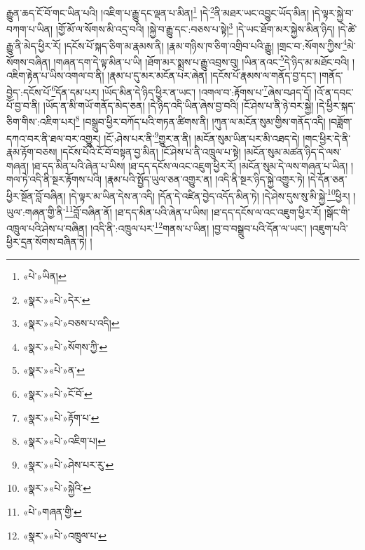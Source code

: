 རྒྱུན་ཆད་ངོ་བོ་གང་ཡིན་པའི། །འཇིག་པ་རྒྱུ་དང་ལྡན་པ་མིན།\footnote{«པེ་»ཡིན།} །དེ་\footnote{«སྣར་»«པེ་»དེར་}ནི་མཐར་ཡང་འབྱུང་ཡོད་མིན། །དེ་ལྟར་སྐྱེ་བ་བཀག་པ་ཡིན། །གྱོ་མོ་ལ་སོགས་མི་འདྲ་བའི། །སྐྱེ་བ་རྒྱུ་དང་:བཅས་པ་སྟེ།\footnote{«སྣར་»«པེ་»བཅས་པ་འདི།} །དེ་ཡང་ཐོག་མར་སྐྱེས་མིན་ཉིད། །དེ་ཚེ་རྒྱུ་ནི་མེད་ཕྱིར་རོ། །དངོས་པོ་སྐད་ཅིག་མ་རྣམས་ནི། །རྣམ་གཉིས་ཁ་ཅིག་འགྲིབ་པའི་རྒྱུ། །གྲང་བ་:སོགས་ཀྱིས་\footnote{«སྣར་»«པེ་»སོགས་ཀྱི་}མེ་སོགས་བཞིན། །གཞན་དག་དེ་ལྟ་མིན་པ་ཡི། །ཐོག་མར་སྨྲས་པ་རྒྱུ་འབྲས་བུ། །ཡིན་ནའང་\footnote{«སྣར་»«པེ་»ན་}དེ་ཉིད་མ་མཐོང་བའི། །འཇིག་རྟེན་པ་ཡིས་འགལ་བ་ནི། །རྣམ་པ་དུ་མར་མངོན་པར་ཞེན། །དངོས་པོ་རྣམས་ལ་གནོད་བྱ་དང་། །གནོད་བྱེད་:དངོས་པོ་\footnote{«སྣར་»«པེ་»ངོ་བོ་}དོན་དམ་པར། །ཡོད་མིན་དེ་ཉིད་ཕྱིར་ན་ཡང་། །འགལ་བ་:རྟོགས་པ་\footnote{«སྣར་»«པེ་»རྟོག་པ་}ཞེས་བཤད་དོ། །འོ་ན་དབང་པོ་བྱ་བ་ནི། །ཡོད་ན་མི་གཡོ་གནོད་མེད་ཅན། །དེ་ཉིད་འདི་ཡིན་ཞེས་བྱ་བའི། །ངོ་ཤེས་པ་ནི་ཉེ་བར་སྐྱེ། །དེ་ཕྱིར་སྐད་ཅིག་གིས་:འཇིག་པར།\footnote{«སྣར་»«པེ་»འཇིག་པ།} །བསྒྲུབ་ཕྱིར་བཀོད་པའི་གཏན་ཚིགས་ནི། །ཀུན་ལ་མངོན་སུམ་གྱིས་གནོད་འདི། །བཟློག་དཀའ་བར་ནི་ཐལ་བར་འགྱུར། །ངོ་:ཤེས་པར་ནི་\footnote{«སྣར་»«པེ་»ཤེས་པར་རུ་}གྱུར་ན་ནི། །མངོན་སུམ་ཡིན་པར་མི་འཐད་དེ། །གང་ཕྱིར་དེ་ནི་རྣམ་རྟོག་བཅས། །དངོས་པོའི་ངོ་བོ་བསྟན་བྱ་མིན། །ངོ་ཤེས་པ་ནི་འཁྲུལ་པ་སྟེ། །མངོན་སུམ་མཚན་ཉིད་དེ་ལས་གཞན། །ཐ་དད་མིན་པའི་ཞེན་པ་ཡིས། །ཐ་དད་དངོས་ལའང་འཇུག་ཕྱིར་རོ། །མངོན་སུམ་དེ་ལས་གཞན་པ་ཡིན། །གལ་ཏེ་འདི་ནི་སྔར་རྟོགས་པའི། །རྣམ་པའི་སྤྱོད་ཡུལ་ཅན་འགྱུར་ན། །འདི་ནི་སྔར་ཉིད་སྐྱེ་འགྱུར་ཏེ། །དེ་དོན་ཅན་ཕྱིར་སྔོན་བློ་བཞིན། །དེ་ལྟར་མ་ཡིན་དེས་ན་འདི། །དོན་དེ་འཛིན་བྱེད་འདོད་མིན་ཏེ། །དེ་ཤེས་དུས་སུ་མི་སྐྱེ་\footnote{«སྣར་»«པེ་»སྐྱེའི་}ཕྱིར། །ཡུལ་:གཞན་གྱི་ནི་\footnote{«པེ་»གཞན་གྱི་}བློ་བཞིན་ནོ། །ཐ་དད་མིན་པའི་ཞེན་པ་ཡིས། །ཐ་དད་དངོས་ལ་འང་འཇུག་ཕྱིར་རོ། །སྒོང་གི་འཁྲུལ་པའི་ཤེས་པ་བཞིན། །འདི་ནི་:འཁྲུལ་པར་\footnote{«སྣར་»«པེ་»འཁྲུལ་པ་}གནས་པ་ཡིན། །བྱ་བ་བསྒྲུབ་པའི་དོན་ལ་ཡང་། །འཇུག་པའི་ཕྱིར་དྲན་སོགས་བཞིན་ཏེ། །
